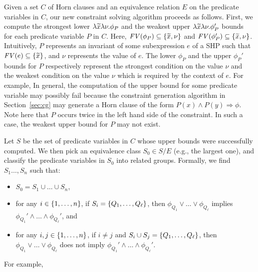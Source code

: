  Given a set \(C\) of 
Horn clauses and an equivalence relation \(E\) on the predicate 
variables in \(C\), our new constraint solving algorithm proceeds as 
follows.  First, we compute the strongest lower \(\lambda \widetilde{x}\lambda 
\nu.\phi_P\) and the weakest upper \(\lambda \widetilde{x}\lambda \nu.\phi_P'\) 
bounds for each predicate variable \(P\) in \(C\).  Here, \(\mathit{FV}({\phi_P}) 
\subseteq \{{\widetilde{x},\nu}\}\) and \(\mathit{FV}({\phi_P'}) \subseteq 
\{{\widetilde{x},\nu}\}\).  Intuitively, \(P\) represents an invariant of some 
subexpression \(e\) of a SHP such that \(\mathit{FV}({e}) \subseteq \{{\widetilde{x}}\}\), 
and \(\nu\) represents the value of \(e\).  The lower \(\phi_P\) and the 
upper \(\phi_{P}'\) bounds for \(P\) respectively represent the 
strongest condition on the value \(\nu\) and the weakest condition on 
the value \(\nu\) which is required by the context of \(e\).  For 
example, \todo{}  In general, the computation of the upper bound for 
some predicate variable may possibly fail because the constraint 
generation algorithm in Section~\ref{sec:cg} may generate a Horn clause 
of the form \(P(x) \land P(y) \Rightarrow \phi\).  Note here that \(P\) 
occurs twice in the left hand side of the constraint.  In such a case, 
the weakest upper bound for \(P\) may not exist.

Let \(S\) be the set of predicate variables in \(C\) whose upper bounds 
were successfully computed.  We then pick an equivalence class \(S_0 \in 
S / E\) (e.g., the largest one), and classify the predicate variables in 
\(S_0\) into related groups.    Formally, we 
find \(S_1\dots,S_n\) such that:
\begin{itemize}
\item \(S_0 = S_1 \cup \dots \cup S_n\),
\item for any \(i \in \{{1,\dots,n}\}\), if \(S_i = 
\{{Q_1,\dots,Q_{\ell}}\}\), then \(\phi_{Q_1} \lor \dots \lor 
\phi_{Q_{\ell}}\) implies \(\phi_{Q_1}' \land \dots \land 
\phi_{Q_{\ell}}'\), and
\item for any \(i,j \in \{{1,\dots,n}\}\), if \(i \neq j\) and 
\(S_i \cup S_j = \{{Q_1,\dots,Q_{\ell}}\}\), then \(\phi_{Q_1} \lor 
\dots \lor \phi_{Q_{\ell}}\) does not imply \(\phi_{Q_1}' \land \dots 
\land \phi_{Q_{\ell}}'\).
\end{itemize}
For example, \todo{}

